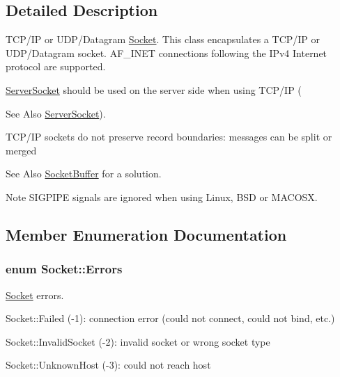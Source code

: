 \subsection{Detailed Description}
T\-C\-P/\-I\-P or U\-D\-P/\-Datagram \hyperlink{class_socket}{Socket}. This class encapsulates a T\-C\-P/\-I\-P or U\-D\-P/\-Datagram socket. A\-F\-\_\-\-I\-N\-E\-T connections following the I\-Pv4 Internet protocol are supported. 

\hyperlink{class_server_socket}{Server\-Socket} should be used on the server side when using T\-C\-P/\-I\-P (\begin{DoxySeeAlso}{See Also}
\hyperlink{class_server_socket}{Server\-Socket}).
\end{DoxySeeAlso}
T\-C\-P/\-I\-P sockets do not preserve record boundaries\-: messages can be split or merged \begin{DoxySeeAlso}{See Also}
\hyperlink{class_socket_buffer}{Socket\-Buffer} for a solution.
\end{DoxySeeAlso}
\begin{DoxyNote}{Note}
S\-I\-G\-P\-I\-P\-E signals are ignored when using Linux, B\-S\-D or M\-A\-C\-O\-S\-X. 
\end{DoxyNote}


\subsection{Member Enumeration Documentation}
\hypertarget{class_socket_a9f68308228badcdd299cd83e62e36976}{
\subsubsection[{Errors}]{\setlength{\rightskip}{0pt plus 5cm}enum {\bf Socket\-::\-Errors}}}\label{class_socket_a9f68308228badcdd299cd83e62e36976}


\hyperlink{class_socket}{Socket} errors. 


\begin{DoxyItemize}
\item Socket\-::\-Failed (-\/1)\-: connection error (could not connect, could not bind, etc.)
\item Socket\-::\-Invalid\-Socket (-\/2)\-: invalid socket or wrong socket type
\item Socket\-::\-Unknown\-Host (-\/3)\-: could not reach host 
\end{DoxyItemize}

